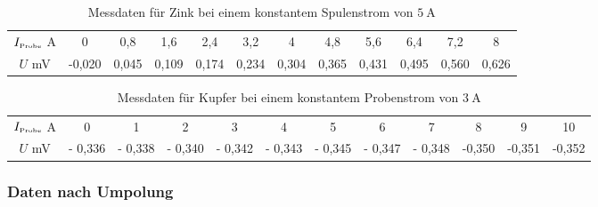 \begin{table}
 \centering
 \begin{tabular}[width=\textwidth]{S| S[table-format=2.3] S[table-format=1.3] S[table-format=1.3] S[table-format=1.3] S[table-format=1.3] S[table-format=1.3] S[table-format=1.3] S[table-format=1.3] S[table-format=1.3] S[table-format=1.3]
 S[table-format=1.3]}

     \midrule
      $I_{\text{\tiny{Probe}}}$  \si{\ampere} & 0 & 0,8 & 1,6 & 2,4 & 3,2 & 4 & 4,8 & 5,6 & 6,4 & 7,2 & 8 \\
      $U$  \si{\milli\volt} & -0,020 & 0,045 & 0,109 & 0,174 & 0,234 & 0,304 & 0,365 & 0,431 & 0,495 & 0,560 & 0,626 \\
      \bottomrule
\end{tabular}
  \caption{Messdaten für Zink bei einem konstantem Spulenstrom von $\SI{5}{\ampere}$}
  \label{tab:Zink_U_H_2}
\end{table}


\begin{table}
 \centering
 \begin{tabular}[width=\textwidth]{S| S[table-format=2.3] S[table-format=1.3] S[table-format=1.3] S[table-format=1.3] S[table-format=1.3] S[table-format=1.3] S[table-format=1.3] S[table-format=1.3] S[table-format=1.3] S[table-format=1.3] S[table-format=1.3]}

     \midrule
      $I_{\text{\tiny{Probe}}}$  \si{\ampere} & 0 & 1 & 2 & 3 & 4 & 5 & 6 & 7 & 8 & 9 & 10 \\
      $U$  \si{\milli\volt} & - 0,336 & - 0,338 & - 0,340 & - 0,342 & - 0,343 & - 0,345 & - 0,347 & - 0,348 & -0,350 & -0,351 & -0,352 \\
      \bottomrule
 \end{tabular}
  \caption{Messdaten für Kupfer bei einem konstantem Probenstrom von $\SI{3}{\ampere}$}
  \label{tab:Kupfer_U_H_2}
\end{table}

\subsubsection{Daten nach Umpolung}

